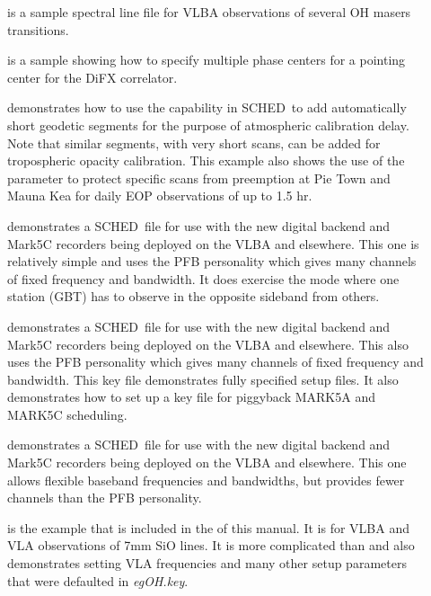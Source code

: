 \documentclass{report}
\newcommand{\schedb}{{\sc SCHED~}}
\begin{document}
\begin{description}
\item[] is a
sample spectral line file for VLBA
observations of several OH masers transitions.

\item[] is
a sample showing how to specify multiple phase centers for a pointing
center for the DiFX correlator.

\item[]
demonstrates how to use the capability in \schedb to add automatically
short geodetic segments for the purpose of atmospheric calibration
delay.  Note that similar segments, with very short scans, can be added
for tropospheric opacity calibration.  This example also shows the use
of the  parameter to protect
specific scans from preemption at Pie Town and Mauna Kea for daily
EOP observations of up to 1.5 hr.

\item[]
demonstrates a \schedb file for use with the new digital backend and
Mark5C recorders being deployed on the VLBA and elsewhere.  This one
is relatively simple and uses the PFB personality which gives many
channels of fixed frequency and bandwidth.  It does exercise the
mode where one station (GBT) has to observe in the opposite sideband
from others.

\item[]
demonstrates a \schedb file for use with the new digital backend and
Mark5C recorders being deployed on the VLBA and elsewhere.  This also
uses the PFB personality which gives many channels of fixed frequency
and bandwidth.  This key file demonstrates fully specified setup
files.  It also demonstrates how to set up a key file for piggyback
MARK5A and MARK5C scheduling.

\item[]
demonstrates a \schedb file for use with the new digital backend
and Mark5C recorders being deployed on the VLBA and elsewhere.
This one allows flexible baseband frequencies and bandwidths, but provides
fewer channels than the PFB personality.

\item[] is the example that is
included in the  of this
manual.  It is for VLBA and VLA observations of 7mm SiO lines.  It
is more complicated than  and also demonstrates setting VLA
frequencies and many other setup parameters that were defaulted
in {\sl egOH.key}.


\end{description}
\end{document}
